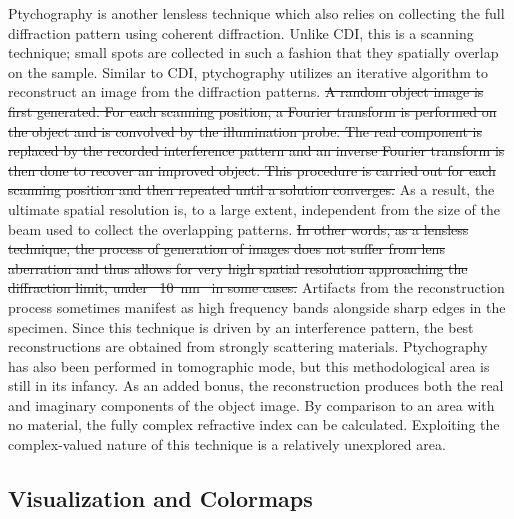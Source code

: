 \documentclass[journal=cmatex,manuscript=perspective]{achemso}
\providecommand{\DIFdeltex}[1]{{\protect\color{red}\sout{#1}}}                      %
\providecommand{\DIFdelbegin}{} %
\providecommand{\DIFdelend}{} %
\providecommand{\DIFdel}[1]{\texorpdfstring{\DIFdeltex{#1}}{}} %
\begin{document}
Ptychography is another lensless technique which also relies on
collecting the full diffraction pattern using coherent
diffraction. Unlike CDI, this is a scanning technique; small spots are
collected in such a fashion that they spatially overlap on the
sample. Similar to CDI, ptychography utilizes an iterative algorithm
to reconstruct an image from the diffraction patterns. \DIFdelbegin \DIFdel{A random object
image is first generated. For each scanning position, a Fourier
transform is performed on the object and is convolved by the
illumination probe. The real component is replaced by the recorded
interference pattern and an inverse Fourier transform is then done to
recover an improved object. This procedure is carried out for each
scanning position and then repeated until a solution converges. }\DIFdelend As a result,
the ultimate spatial resolution is, to a large extent, independent
from the size of the beam used to collect the overlapping
patterns. \DIFdelbegin \DIFdel{In other words, as a lensless technique, the process of
generation of images does not suffer from lens aberration and thus
allows for very high spatial resolution approaching the diffraction
limit, under \mbox{%
\SI{10}{nm} }%
in some cases. }\DIFdelend Artifacts from the reconstruction process sometimes manifest
as high frequency bands alongside sharp edges in the specimen. Since
this technique is driven by an interference pattern, the best
reconstructions are obtained from strongly scattering
materials. Ptychography has also been performed in tomographic
mode\cite{venkatakrishnan2016}, but this methodological area is still
in its infancy. As an added bonus, the reconstruction produces both
the real and imaginary components of the object image. By comparison
to an area with no material, the fully complex refractive index can be
calculated. Exploiting the complex-valued nature of this technique is
a relatively unexplored area.

\subsection{Visualization and Colormaps}
\end{document}

